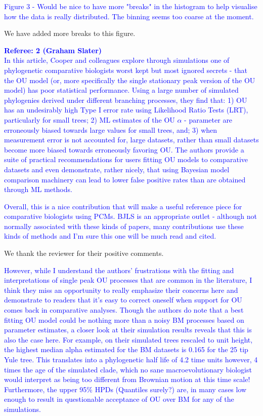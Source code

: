\documentclass[12pt]{letter}
\begin{document}
\begin{letter}{}
\textcolor{blue}{Figure 3 - Would be nice to have more "breaks" in the histogram to help visualise how the data is really distributed. The binning seems too coarse at the moment.}

We have added more breaks to this figure.

\textcolor{blue}{\textbf{Referee: 2 (Graham Slater)}\\
In this article, Cooper and colleagues explore through simulations one of phylogenetic comparative biologists worst kept but most ignored secrets - that the OU model (or, more specifically the single stationary peak version of the OU model) has poor statistical performance. Using a large number of simulated phylogenies derived under different branching processes, they find that: 1) OU has an undesirably high Type I error rate using Likelihood Ratio Tests (LRT), particularly for small trees; 2) ML estimates of the OU $\alpha$ - parameter are erroneously biased towards large values for small trees, and; 3) when measurement error is not accounted for, large datasets, rather than small datasets become more biased towards erroneously favoring OU. The authors provide a suite of practical recommendations for users fitting OU models to comparative datasets and even demonstrate, rather nicely, that using Bayesian model comparison machinery can lead to lower false positive rates than are obtained through ML methods.}

\textcolor{blue}{Overall, this is a nice contribution that will make a useful reference piece for comparative biologists using PCMs. BJLS is an appropriate outlet - although not normally associated with these kinds of papers, many contributions use these kinds of methods and I'm sure this one will be much read and cited.}

We thank the reviewer for their positive comments.

\textcolor{blue}{However, while I understand the authors’ frustrations with the fitting and interpretations of single peak OU processes that are common in the literature, I think they miss an opportunity to really emphasize their concerns here and demonstrate to readers that it's easy to correct oneself when support for OU comes back in comparative analyses. Though the authors do note that a best fitting OU model could be nothing more than a noisy BM processes based on parameter estimates, a closer look at their simulation results reveals that this is also the case here. For example, on their simulated trees rescaled to unit height, the highest median alpha estimated for the BM datasets is 0.165 for the 25 tip Yule tree. This translates into a phylogenetic half life of 4.2 time units however, 4 times the age of the simulated clade, which no sane macroevolutionary biologist would interpret as being too different from Brownian motion at this time scale! Furthermore, the upper 95\% HPDs (Quantiles surely?) are, in many cases low enough to result in questionable acceptance of OU over BM for any of the simulations.}


\end{letter}
\end{document}
